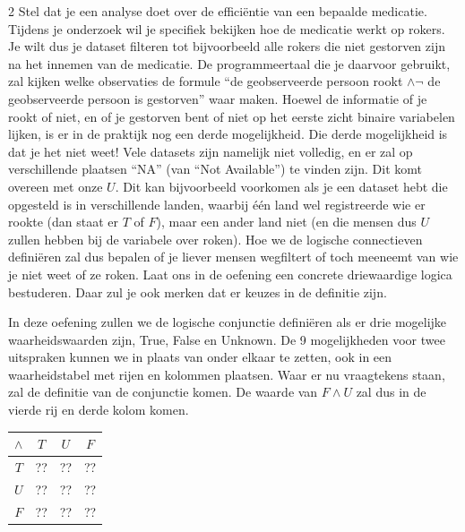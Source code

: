 \begin{multicols}{2}
Stel dat je een analyse doet over de efficiëntie van een bepaalde medicatie.
Tijdens je onderzoek wil je specifiek bekijken hoe de medicatie werkt op rokers. Je wilt dus je dataset filteren tot bijvoorbeeld alle rokers die niet gestorven zijn na het innemen van de medicatie.
De programmeertaal die je daarvoor gebruikt, zal kijken welke observaties de formule ``de geobserveerde persoon rookt $\land \lnot$ de geobserveerde persoon is gestorven'' waar maken.
Hoewel de informatie of je rookt of niet, en of je gestorven bent of niet op het eerste zicht binaire variabelen lijken, is er in de praktijk nog een derde mogelijkheid.
Die derde mogelijkheid is dat je het niet weet!
Vele datasets zijn namelijk niet volledig, en er zal op verschillende plaatsen ``NA'' (van ``Not Available'') te vinden zijn.
Dit komt overeen met onze $U$.
Dit kan bijvoorbeeld voorkomen als je een dataset hebt die opgesteld is in verschillende landen, waarbij één land wel registreerde wie er rookte (dan staat er $T$ of $F$), maar een ander land niet (en die mensen dus $U$ zullen hebben bij de variabele over roken).
Hoe we de logische connectieven definiëren zal dus bepalen of je liever mensen wegfiltert of toch meeneemt van wie je niet weet of ze roken.
Laat ons in de oefening een concrete driewaardige logica bestuderen.
Daar zul je ook merken dat er keuzes in de definitie zijn.\\


\end{multicols}

In deze oefening zullen we de logische conjunctie definiëren als er drie mogelijke waarheidswaarden zijn, True, False en Unknown. De 9 mogelijkheden voor twee uitspraken kunnen we in plaats van onder elkaar te zetten, ook in een waarheidstabel met rijen en kolommen plaatsen.
Waar er nu vraagtekens staan, zal de definitie van de conjunctie komen.
De waarde van $F \land U$ zal dus in de vierde rij en derde kolom komen.

\begin{center}
\begin{tabular}{c|c|c|c}  
$\land$ & $T$ & $U$ & $F$\\
\hline
$T$ & ?? & ?? & ??\\
\hline
$U$ & ?? & ?? & ??\\
\hline
$F$ & ?? & ?? & ??
\end{tabular}
\end{center}

